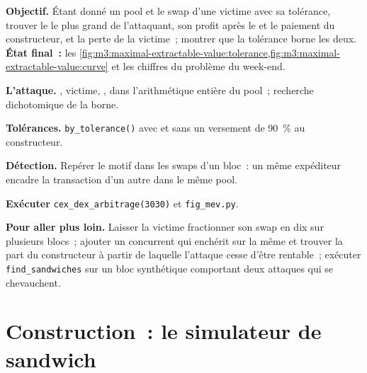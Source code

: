 \begin{tutorial}
\textbf{Objectif.} Étant donné un pool et le swap d'une victime avec sa tolérance, trouver le  le plus grand de l'attaquant, son profit après le  et le
paiement du constructeur, et la perte de la victime~; montrer que la tolérance borne les deux. \textbf{État final~:}
les \cref{fig:m3:maximal-extractable-value:tolerance,fig:m3:maximal-extractable-value:curve} et les chiffres du problème du week-end.
\begin{tutsteps}
\item \textbf{L'attaque.} , victime, , dans l'arithmétique entière du pool~; recherche dichotomique de la borne.
\label{lst:m3:maximal-extractable-value:sandwich}
\item \textbf{Tolérances.} \texttt{by\_tolerance()} avec et sans un versement de 90~\% au constructeur.
\item \textbf{Détection.} Repérer le motif dans les swaps d'un bloc~: un même expéditeur encadre la transaction d'un autre dans le même pool.
\label{lst:m3:maximal-extractable-value:detect}
\item \textbf{Exécuter} \texttt{cex\_dex\_arbitrage(3030)} et \texttt{fig\_mev.py}.
\end{tutsteps}
\textbf{Pour aller plus loin.} Laisser la victime fractionner son swap en dix sur plusieurs blocs~; ajouter un  concurrent qui enchérit sur la même  et trouver la
part du constructeur à partir de laquelle l'attaque cesse d'être rentable~; exécuter \texttt{find\_sandwiches} sur un bloc synthétique comportant deux attaques qui se chevauchent.
\end{tutorial}

\section{Construction~: le simulateur de sandwich}\label{bld:m3:maximal-extractable-value:sandwich}

